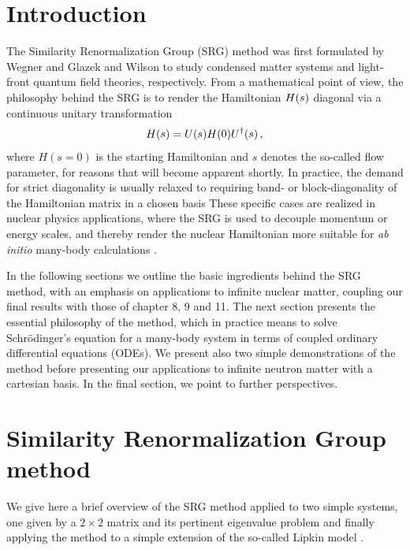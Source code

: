 \section{Introduction}

The Similarity Renormalization Group (SRG) method was first formulated by
Wegner \cite{Wegner:1994dk} and Glazek and Wilson \cite{Glazek:1993il}
to study condensed matter systems and light-front quantum field
theories, respectively.  From a mathematical point of view, the
philosophy behind the SRG is to render the Hamiltonian $H(s)$
diagonal via a continuous unitary transformation
\begin{equation}\label{eq:cut}
  \HO(s)=\UO(s)\HO(0)\UUO(s)\,,
\end{equation}
where $H(s=0)$ is the starting Hamiltonian and $s$ denotes the so-called flow
parameter, for reasons that will become apparent shortly. In practice, the demand 
for strict diagonality is usually relaxed to requiring band- or block-diagonality 
of the Hamiltonian matrix in a chosen basis
These specific cases are realized in nuclear
physics applications, where the SRG is used to decouple momentum or
energy scales, and thereby render the nuclear Hamiltonian more
suitable for \emph{ab initio} many-body calculations \cite{bogner2007,bogner2010,morris2015,bogner2016}.

In the following sections we outline the basic ingredients behind the
SRG method, with an emphasis on applications to infinite nuclear
matter, coupling our final results with those of chapter 8, 9 and
11. The next section presents the essential philosophy of the method,
which in practice means to solve Schr\"odinger's equation for a
many-body system in terms of coupled ordinary differential equations
(ODEs). We present also two simple demonstrations of the method before
presenting our applications to infinite neutron matter with a
cartesian basis. In the final section, we point to further
perspectives.

\section{Similarity Renormalization Group method}

We give here a brief overview of the SRG method applied to two simple systems, one given by a $2\times 2$ matrix and its pertinent eigenvalue problem and finally applying the method to a simple extension of the so-called Lipkin model \cite{lipkin,ellis2007}. 


